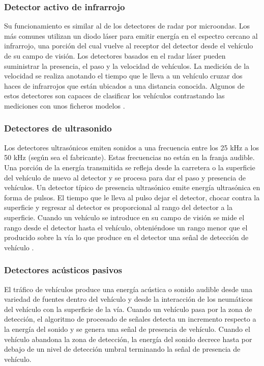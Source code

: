 \subsubsection{ Detector activo de infrarrojo}
Su funcionamiento es similar al de los detectores de radar por microondas. Los más comunes utilizan un diodo láser para emitir energía 
en el espectro cercano al infrarrojo, una porción del cual vuelve al receptor del detector desde el vehículo de su campo de visión. 
Los detectores basados en el radar láser pueden suministrar la presencia, el paso y la velocidad de vehículos. 
La medición de la velocidad se realiza anotando el tiempo que le lleva a un vehículo cruzar dos haces de infrarrojos que están ubicados 
a una distancia conocida. Algunos de estos detectores son capaces de clasificar los vehículos contrastando las mediciones con unos 
ficheros modelos \cite{14}.
\subsubsection{Detectores de ultrasonido}
Los detectores ultrasónicos emiten sonidos a una frecuencia entre los 25 kHz a los 50 kHz (según sea el fabricante). 
Estas frecuencias no están en la franja audible. Una porción de la energía transmitida se refleja desde la carretera o la superficie 
del vehículo de nuevo al detector y se procesa para dar el paso y presencia de vehículos. Un detector típico de presencia ultrasónico 
emite energía ultrasónica en forma de pulsos. El tiempo que le lleva al pulso dejar el detector, chocar contra la superficie y regresar 
al detector es proporcional al rango del detector a la superficie. Cuando un vehículo se introduce en su campo de visión se mide el rango 
desde el detector hasta el vehículo, obteniéndose un rango menor que el producido sobre la vía lo que produce en el detector una señal 
de detección de vehículo \cite{14}.
\subsubsection{ Detectores acústicos pasivos}
El tráfico de vehículos produce una energía acústica o sonido audible desde una variedad de fuentes dentro del vehículo y desde la 
interacción de los neumáticos del vehículo con la superficie de la vía. Cuando un vehículo pasa por la zona de detección, el algoritmo 
de procesado de señales detecta un incremento respecto a la energía del sonido y se genera una señal de presencia de vehículo. 
Cuando el vehículo abandona la zona de detección, la energía del sonido decrece hasta por debajo de un nivel de detección umbral 
terminando la señal de presencia de vehículo\cite{14}.
